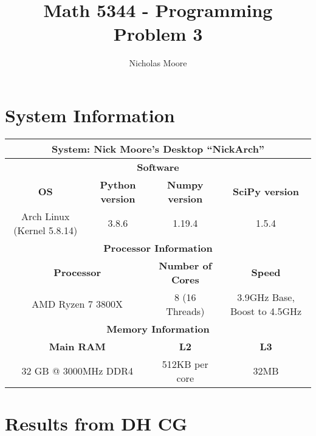 \documentclass[oneside,final]{amsart}  %
\title{Math 5344 - Programming Problem 3}
\author{Nicholas Moore}
\begin{document}
\maketitle
\section{System Information}
  \begin{table}[htpb]
    \centering
    \begin{tabular}{|c|c|c|c|}
      \hline
      \multicolumn{4}{|c|}{\textbf{System: }Nick Moore's Desktop ``NickArch'' }\\
      \hline
      \hline
      \multicolumn{4}{|c|}{\textbf{Software}} \\
      \hline
      \textbf{OS} & \textbf{Python version} & \textbf{Numpy version} & \textbf{SciPy version} \\
      \hline
      Arch Linux (Kernel 5.8.14) & 3.8.6 & 1.19.4 & 1.5.4 \\
      \hline
      \multicolumn{4}{|c|}{\textbf{Processor Information}} \\
      \hline
      \multicolumn{2}{|c|}{\textbf{Processor}} & \textbf{Number of Cores} & \textbf{Speed} \\
      \hline
      \multicolumn{2}{|c|}{AMD Ryzen 7 3800X} & 8 (16 Threads) & 3.9GHz Base, Boost to 4.5GHz \\
      \hline
      \multicolumn{4}{|c|}{\textbf{Memory Information}} \\
      \hline
      \multicolumn{2}{|c|}{\textbf{Main RAM}} & \textbf{L2} & \textbf{L3} \\
      \hline
      \multicolumn{2}{|c|}{32 GB @ 3000MHz DDR4} & 512KB  per core & 32MB \\
      \hline
    \end{tabular}
  \end{table}
\section{Results from DH CG}
\end{document}
